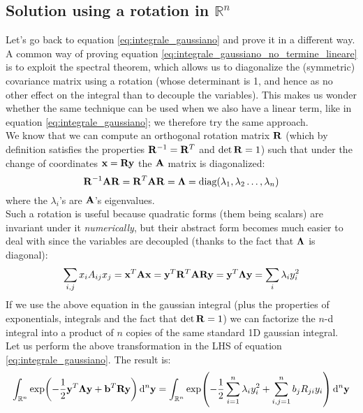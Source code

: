 \documentclass[a4paper]{article}
\newcommand{\R}{\mathbb{R}}
\newcommand{\mat}[1]{\vb{#1}}
\begin{document}
\subsection{Solution using a rotation in $\R^n$}
Let's go back to equation \eqref{eq:integrale_gaussiano} and prove it in a different way. A common way of proving equation \eqref{eq:integrale_gaussiano_no_termine_lineare} is to exploit the spectral theorem, which allows us to diagonalize the (symmetric) covariance matrix using a rotation (whose determinant is 1, and hence as no other effect on the integral than to decouple the variables). This makes us wonder whether the same technique can be used when we also have a linear term, like in equation \eqref{eq:integrale_gaussiano}; we therefore try the same approach.\\
We know that we can compute an orthogonal rotation matrix $\mat{R}$ (which by definition satisfies the properties $\mat{R}^{-1} = \mat{R}^T$ and $\det\mat{R}=1$) such that under the change of coordinates $\vb{x} = \mat{R}\vb{y}$ the $\vb{A}$ matrix is diagonalized:
\begin{equation}
    \mat{R}^{-1}\mat{A}\mat{R} = \mat{R}^T \mat{A}\mat{R} = \mat{\Lambda} = \text{diag}(\lambda_1, \lambda_2 \dots, \lambda_n)
\end{equation}
where the $\lambda_i$'s are $\mat{A}$'s eigenvalues.\\
Such a rotation is useful because quadratic forms (them being scalars) are invariant under it \emph{numerically}, but their abstract form becomes much easier to deal with since the variables are decoupled (thanks to the fact that $\mat{\Lambda}$ is diagonal):
\begin{equation*}
    \sum_{i,j} x_i A_{ij} x_j = \vb{x}^T \mat{A}\vb{x} = \vb{y}^T \mat{R}^T \mat{A}\mat{R}\vb{y} = \vb{y}^T\mat{\Lambda}\vb{y} = \sum_i \lambda_i y_i^2
\end{equation*}
If we use the above equation in the gaussian integral (plus the properties of exponentials, integrals and the fact that $\det\mat{R} = 1$) we can factorize the $n$-d integral into a product of $n$ copies of the same standard 1D gaussian integral.\\
Let us perform the above transformation in the LHS of equation \eqref{eq:integrale_gaussiano}. The result is:
\begin{equation*}
    \int_{\R^n}\exp(-\frac{1}{2}\vb{y}^T\mat{\Lambda}\vb{y} + \vb{b}^T \mat{R} \vb{y}) \dd[n]{\vb{y}} = \int_{\R^n}\exp(-\frac{1}{2}\sum_{i=1}^n \lambda_i y_i^2 + \sum_{i,j=1}^n b_j R_{ji} y_i) \dd[n]{\vb{y}}
\end{equation*}
\end{document}
